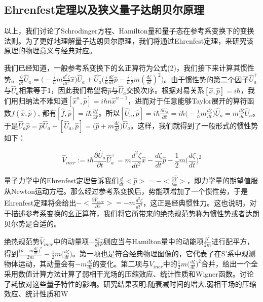 \documentclass[a4paper]{article}
\begin{document}
    \subsection{Ehrenfest定理以及狭义量子达朗贝尔原理}

        以上，我们讨论了Schrodinger方程、Hamilton量和量子态在参考系变换下的变换法则。为了更好地理解量子达朗贝尔原理，我们将通过Ehrenfest定理，来研究该原理的物理意义与经典对应。

        我们已经知道，一般参考系变换下的幺正算符为公式(2)，我们接下来计算其惯性势。$\frac{\partial}{\partial t}\hat{U}_a = \big(-\frac{i}{\hbar}m\frac{d^2 \zeta}{dt^2} \hat{x}\big)\hat{U}_a + \hat{U_a}\big(\frac{i}{\hbar}\frac{d\zeta}{dt}\hat{p} - \frac{i}{\hbar}\frac{1}{2}m(\frac{d\zeta}{dt})^2\big)$。由于惯性势的第二个因子$\hat{U}_a^+$与$\hat{U}_a$相乘等于1，因此我们希望将$\hat{p}$与$\hat{U}_a$交换次序。根据对易关系$[\hat{x},\hat{p}]=i\hbar$，我们用归纳法不难知道$[\hat{x}^n,\hat{p}]=i\hbar n\hat{x}^{n-1}$，进而对于任意能够Taylor展开的算符函数$f(\hat{x},\hat{p})$, 都有$[\hat{f}, \hat{p}]=i\hbar\frac{\partial f}{\partial\hat{x}}$。所以$[\hat{U}_a, \hat{p}] = i\hbar\frac{\partial\hat{U}_a}{\partial\hat{x}} = i\hbar\big(-\frac{i}{\hbar}m\frac{d\zeta}{dt}\big)\hat{U}_a = m\frac{d\zeta}{dt}\hat{U}_a$。于是$\hat{U}_a\hat{p} = \hat{p}\hat{U}_a + [\hat{U}_a, \hat{p}] = \big(\hat{p}+m\frac{d\zeta}{dt}\big)\hat{U}_a$。这样，我们就得到了一般形式的惯性势如下：

        \begin{equation}
            \hat{V}_{iner} := i\hbar\frac{\partial\hat{U}_a}{\partial t}\hat{U}_a^+ = m \frac{d^2\zeta}{d t^2}\hat{x}-\frac{d\zeta}{dt}\hat{p}-\frac{1}{2}m\bigg(\frac{d\zeta}{dt}\bigg)^2
        \end{equation}

        量子力学中的Ehrenfest定理告诉我们$\frac{d}{dt}<\hat{p}>=-<\frac{\partial\hat{V}}{\partial \hat{x}}>$，即力学量的期望值服从Newton运动方程。那么经过参考系变换后，势能项增加了一个惯性势，于是Ehrenfest定理将会给出$-<\frac{\partial\hat{V}_{iner}}{\partial \hat{x}}>=-m \frac{d^2\zeta}{d t^2}$，这正是经典惯性力。这也说明，对于描述参考系变换的幺正算符，我们将它所带来的绝热规范势称为惯性势或者达朗贝尔势是合适的。

        绝热规范势$\hat{V}_{iner}$中的动量项$-\frac{d\zeta}{dt}\hat{p}$则应当与Hamilton量中的动能项$\frac{\hat{p}^2}{2m}$进行配平方，得到$\frac{\big(\hat{p}-m\frac{d\zeta}{dt}\big)^2}{2m}-\frac{1}{2}m\big(\frac{d\zeta}{dt}\big)$。第一项也是符合经典物理图像的，它代表了在S'系中观测物体运动，其动量会有$-m\frac{d\zeta}{dt}$的变化。第二项与$V_{iner}$中的$\frac{1}{2}m\big(\frac{d\zeta}{dt}\big)^2$合并，给出一个全采用数值计算方法计算了弱相干光场的压缩效应、统计性质和Wigner函数。讨论了耗散对这些量子特性的影响。研究结果表明:随衰减时间的增大,弱相干场的压缩效应、统计性质和W
        
\end{document}
